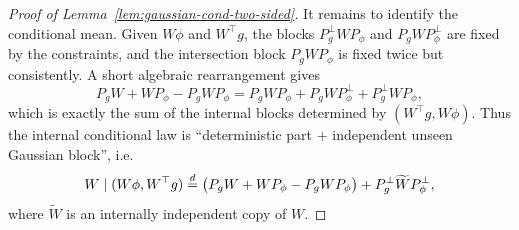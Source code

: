 \begin{proof}[Proof of Lemma~\ref{lem:gaussian-cond-two-sided}]
It remains to identify the conditional mean. Given $W\phi$ and $W^\top g$, the blocks $P_g^\perp W P_\phi$ and $P_g W P_\phi^\perp$ are fixed by the constraints, and the intersection block $P_g W P_\phi$ is fixed twice but consistently. A short algebraic rearrangement gives
\begin{equation}
\label{eq:appa-inclusion-exclusion}
P_g W + W P_\phi - P_g W P_\phi = P_g W P_\phi + P_g W P_\phi^\perp + P_g^\perp W P_\phi,
\end{equation}
which is exactly the sum of the internal blocks determined by $(W^\top g, W\phi)$. Thus the internal conditional law is ``deterministic part $+$ independent unseen Gaussian block'', i.e.\
\begin{equation}
\label{eq:appa-two-sided-final}
W \mid (W\phi, W^\top g) \stackrel{d}{=} \bigl(P_g W + W P_\phi - P_g W P_\phi\bigr) + P_g^\perp \widetilde{W} P_\phi^\perp,
\end{equation}
where $\widetilde{W}$ is an internally independent copy of $W$.
\end{proof}
